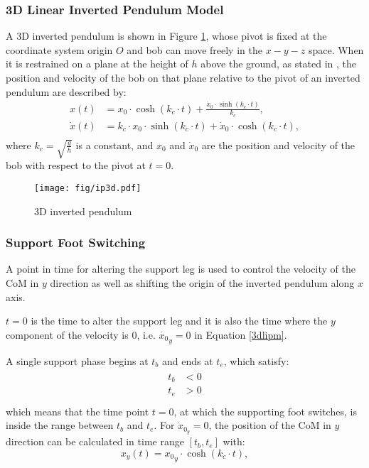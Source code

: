 \subsubsection{3D Linear Inverted Pendulum Model}
A 3D inverted pendulum is shown in Figure {\ref{3dinvertedpendulum}}, whose pivot is fixed at the coordinate system origin $ O $ and bob can move freely in the $ x-y-z $ space. When it is restrained on a plane at the height of $ h $ above the ground, as stated in \cite{kajita2002realtime}, the position and velocity of the bob on that plane relative to the pivot of an inverted pendulum are described by:
\begin{equation}
\label{3dlipm}
\begin{split}
x(t) &= x_0\cdot\cosh(k_c\cdot t)+\frac{\dot{x}_0\cdot\sinh(k_c\cdot t)}{k_c},\\
\dot{x}(t) &= k_c \cdot x_0\cdot\sinh(k_c \cdot t)+\dot{x}_0\cdot\cosh(k_c\cdot t),\\ 
\end{split}
\end{equation}
where $ k_c = \sqrt{\frac{g}{h}} $ is a constant, and $ x_0 $ and $ \dot{x}_0 $ are the position and velocity of the bob with respect to the pivot at $ t= 0 $.
\begin{figure}[H]
	\centering
	\texttt{[image: fig/ip3d.pdf]}
	\caption{3D inverted pendulum}
	\label{3dinvertedpendulum}
\end{figure}
\subsubsection{Support Foot Switching}
A point in time for altering the support leg is used to control the velocity of the CoM in $ y $ direction as well as shifting the origin of the inverted pendulum along $ x $ axis.

$ t=0 $ is the time to alter the support leg and it is also the time where the $ y $ component of the velocity is 0, i.e. $ \dot{x_0}_y=0 $ in Equation {\ref{3dlipm}}.

A single support phase begins at $ t_b $ and ends at $ t_e $, which satisfy:
\begin{align}
\begin{split}
t_b &< 0\\
t_e &> 0\\
\end{split}
\end{align}
which means that the time point $ t=0 $, at which the supporting foot switches, is inside the range between $ t_b $ and $ t_e $. For $ \dot{x}_{0_y}=0 $, the position of the CoM in $ y $ direction can be calculated in time range $ \left[t_b,t_e\right] $ with:
\begin{equation}
x_y(t) = {x_0}_y\cdot\cosh(k_c\cdot t),
\end{equation}
 
